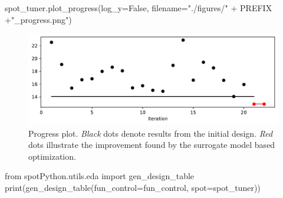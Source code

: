 \documentclass[
  letterpaper,
  DIV=11,
  numbers=noendperiod]{scrreprt}
\newenvironment{Shaded}{\begin{snugshade}}{\end{snugshade}}
\newcommand{\BuiltInTok}[1]{\textcolor[rgb]{0.00,0.23,0.31}{#1}}
\newcommand{\ImportTok}[1]{\textcolor[rgb]{0.00,0.46,0.62}{#1}}
\newcommand{\NormalTok}[1]{\textcolor[rgb]{0.00,0.23,0.31}{#1}}
\newcommand{\OperatorTok}[1]{\textcolor[rgb]{0.37,0.37,0.37}{#1}}
\newcommand{\StringTok}[1]{\textcolor[rgb]{0.13,0.47,0.30}{#1}}
\newcommand{\VariableTok}[1]{\textcolor[rgb]{0.07,0.07,0.07}{#1}}
\begin{document}
\begin{Shaded}
\begin{Highlighting}[]
\NormalTok{spot\_tuner.plot\_progress(log\_y}\OperatorTok{=}\VariableTok{False}\NormalTok{,}
\NormalTok{    filename}\OperatorTok{=}\StringTok{"./figures/"} \OperatorTok{+}\NormalTok{ PREFIX }\OperatorTok{+}\StringTok{"\_progress.png"}\NormalTok{)}
\end{Highlighting}
\end{Shaded}

\begin{figure}[H]

{\centering \includegraphics{033_spot_lightning_linear_sensitive_files/figure-pdf/cell-17-output-1.pdf}

}

\caption{Progress plot. \emph{Black} dots denote results from the
initial design. \emph{Red} dots illustrate the improvement found by the
surrogate model based optimization.}

\end{figure}%

\begin{Shaded}
\begin{Highlighting}[]
\ImportTok{from}\NormalTok{ spotPython.utils.eda }\ImportTok{import}\NormalTok{ gen\_design\_table}
\BuiltInTok{print}\NormalTok{(gen\_design\_table(fun\_control}\OperatorTok{=}\NormalTok{fun\_control, spot}\OperatorTok{=}\NormalTok{spot\_tuner))}
\end{Highlighting}
\end{Shaded}
\end{document}
